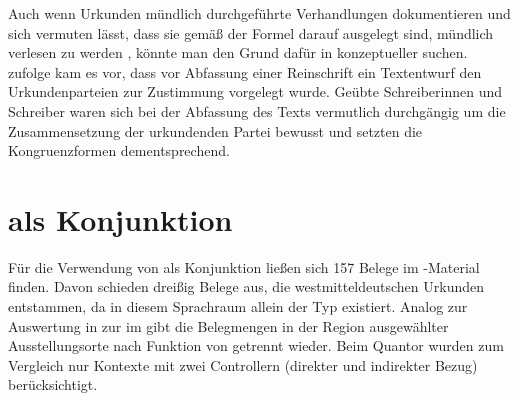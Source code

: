 Auch wenn Urkunden mündlich durchgeführte
Verhandlungen dokumentieren und sich vermuten lässt, dass sie gemäß der Formel
  darauf ausgelegt sind, mündlich verlesen
zu werden \autocites[595]{schmidtwiegand1998b}[31]{schulze2011}, könnte man den
Grund dafür in konzeptueller  suchen.
\citet[588--589]{frenz1998b} zufolge kam es vor, dass vor Abfassung einer
Reinschrift ein Textentwurf den Urkundenparteien zur Zustimmung vorgelegt
wurde. Geübte Schreiberinnen und Schreiber waren sich bei der Abfassung des
Texts vermutlich durchgängig um die Zusammensetzung der urkundenden Partei
bewusst und setzten die Kongruenzformen dementsprechend.



\section{ als Konjunktion}
\label{sec:caokonjunktion}

Für die Verwendung von   als Konjunktion ließen sich
157 Belege im \CAO{}-Material finden. Davon schieden dreißig Belege aus, die
westmitteldeutschen Urkunden entstammen, da in diesem
Sprachraum allein der Typ  existiert. Analog
zur Auswertung in  zur  im
\CAO{} gibt  die Belegmengen in der Region
ausgewählter Ausstellungs\-orte nach Funktion von  getrennt wieder.
Beim Quantor wurden zum Vergleich nur Kontexte mit zwei
Controllern (direkter und indirekter Bezug) berücksichtigt.

